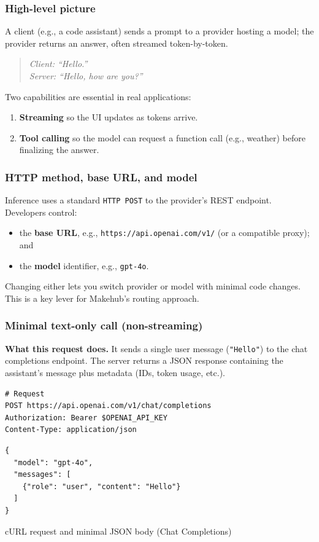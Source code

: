 \documentclass[english]{article}
\begin{document}
\subsubsection{High-level picture}

A client (e.g., a code assistant) sends a prompt to a provider hosting a model; the provider returns an answer, often streamed token-by-token.

\begin{quote}\itshape
Client: ``Hello.'' \\
Server: ``Hello, how are you?''
\end{quote}

Two capabilities are essential in real applications:
\begin{enumerate}
  \item \textbf{Streaming} so the UI updates as tokens arrive.
  \item \textbf{Tool calling} so the model can request a function call (e.g., weather) before finalizing the answer.
\end{enumerate}

\subsubsection{HTTP method, base URL, and model}

Inference uses a standard \texttt{HTTP POST} to the provider's REST endpoint. Developers control:
\begin{itemize}
  \item the \textbf{base URL}, e.g., \texttt{https://api.openai.com/v1/} (or a compatible proxy); and
  \item the \textbf{model} identifier, e.g., \texttt{gpt-4o}.
\end{itemize}
Changing either lets you switch provider or model with minimal code changes. This is a key lever for Makehub's routing approach.

\subsubsection{Minimal text-only call (non-streaming)}

\noindent\textbf{What this request does.}
It sends a single user message (\texttt{"Hello"}) to the chat completions endpoint. The server returns a JSON response containing the assistant's message plus metadata (IDs, token usage, etc.).

\begin{listing}[H]
\begin{verbatim}
# Request
POST https://api.openai.com/v1/chat/completions
Authorization: Bearer $OPENAI_API_KEY
Content-Type: application/json
\end{verbatim}
\begin{verbatim}
{
  "model": "gpt-4o",
  "messages": [
    {"role": "user", "content": "Hello"}
  ]
}
\end{verbatim}
\caption{cURL request and minimal JSON body (Chat Completions)}
\end{listing}
\end{document}
